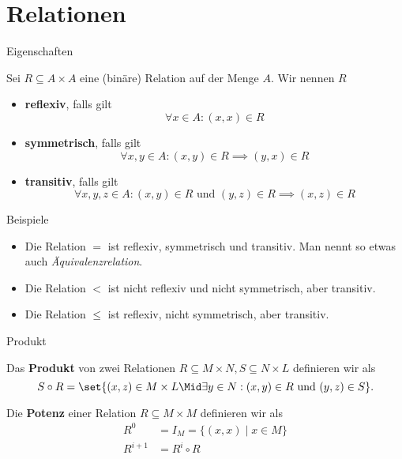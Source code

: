 \section{Relationen}
\begin{frame}{Eigenschaften}
	\begin{Definition}
		Sei $R \subseteq A \times A$ eine (binäre) Relation auf der Menge $A$. Wir nennen $R$
		\begin{itemize}[<+->]
			\item \textbf{reflexiv}, falls gilt $$\forall x \in A: (x,x) \in R$$
			\item \textbf{symmetrisch}, falls gilt $$\forall x,y \in A: (x,y) \in R \implies (y,x) \in R$$
			\item \textbf{transitiv}, falls gilt $$\forall x,y,z \in A: (x,y) \in R \text{ und } (y,z) \in R \implies (x,z) \in R$$
		\end{itemize}
	\end{Definition}
\end{frame}

\begin{frame}{Beispiele}
	\begin{itemize}
		\item Die Relation $=$ ist \pause reflexiv, symmetrisch und transitiv. Man nennt so etwas auch \emph{Äquivalenzrelation}.
		\item \pause Die Relation $<$ ist \pause nicht reflexiv und nicht symmetrisch, aber transitiv.
		\item \pause Die Relation $\leq$ ist \pause reflexiv, nicht symmetrisch, aber transitiv.
	\end{itemize}
\end{frame}

\begin{frame}{Produkt}
	\begin{Definition}
		Das \textbf{Produkt} von zwei Relationen $R \subseteq M \times N, S \subseteq N \times L$ definieren wir als $$S \circ R = \set{(x,z) \in M \times L \Mid \exists y \in N : (x,y) \in R \text{ und } (y,z) \in S }.$$
	\end{Definition}	
	\pause
	
	\begin{Definition}
		Die \textbf{Potenz} einer Relation $R \subseteq M \times M$ definieren wir als
		\begin{align*}
			R^0 &= I_M = \{(x,x) \mid x \in M \} \\
			R^{i+1} &= R^i \circ R
		\end{align*}
	\end{Definition}

\end{frame}

